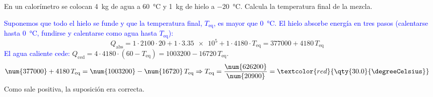 \begin{exercise}
    En un calorímetro se colocan \qty{4}{\kg} de agua a \qty{60}{\degreeCelsius} y \qty{1}{\kg} de hielo a \qty{-20}{\degreeCelsius}. Calcula la temperatura final de la mezcla.
    \begin{solu}
        \textcolor{blue}{Suponemos que todo el hielo se funde y que la temperatura final, \(T_{\text{eq}}\), es mayor que \qty{0}{\degreeCelsius}. El hielo absorbe energía en tres pasos (calentarse hasta \qty{0}{\degreeCelsius}, fundirse y calentarse como agua hasta \(T_{\text{eq}}\)):}
        \[ Q_{\text{abs}} = 1 \cdot 2100 \cdot 20 + 1 \cdot \num{3.35e5} + 1 \cdot 4180 \cdot T_{\text{eq}} = \num{377000} + 4180\,T_{\text{eq}} \]
        \textcolor{blue}{El agua caliente cede:} \(Q_{\text{ced}} = 4 \cdot 4180 \cdot (60 - T_{\text{eq}}) = \num{1003200} - \num{16720}\,T_{\text{eq}}\).
        \[ \num{377000} + 4180\,T_{\text{eq}} = \num{1003200} - \num{16720}\,T_{\text{eq}} \Rightarrow T_{\text{eq}} = \frac{\num{626200}}{\num{20900}} = \textcolor{red}{\qty{30.0}{\degreeCelsius}} \]
        Como sale positiva, la suposición era correcta.
    \end{solu}
\end{exercise}

